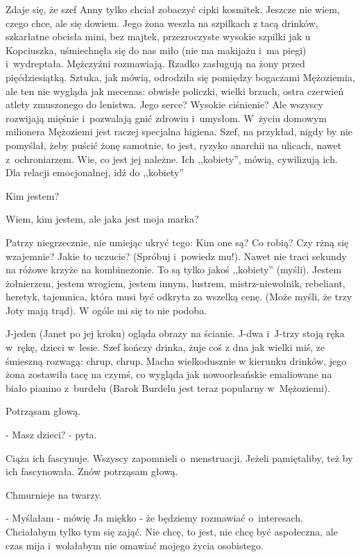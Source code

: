 \documentclass[oneside,polish,12pt,sfheadings]{mwbk}
\begin{document}
Zdaje się, że szef Anny tylko chciał zobaczyć cipki kosmitek. Jeszcze
nie wiem, czego chce, ale się dowiem. Jego żona weszła na szpilkach
z tacą drinków, szkarłatne obcisła mini, bez majtek, przezroczyste
wysokie szpilki jak u Kopciuszka, uśmiechnęła się do nas miło (nie
ma makijażu i~ma piegi) i~wydreptała. Mężczyźni rozmawiają. Rzadko
zasługują na żony przed pięćdziesiątką. Sztuka, jak mówią, odrodziła
się pomiędzy bogaczami Mężoziemia, ale ten nie wygląda jak mecenas:
obwisłe policzki, wielki brzuch, ostra czerwień atlety zmuszonego
do lenistwa. Jego serce? Wysokie ciśnienie? Ale wszyscy rozwijają
mięśnie i~pozwalają gnić zdrowiu i~umysłom. W~życiu domowym milionera
Mężoziemi jest raczej specjalna higiena. Szef, na przykład, nigdy
by nie pomyślał, żeby puścić żonę samotnie, to jest, ryzyko anarchii
na ulicach, nawet z~ochroniarzem. Wie, co jest jej należne. Ich ,,kobiety'',
mówią, cywilizują ich. Dla relacji emocjonalnej, idź do ,,kobiety''

Kim jestem?

Wiem, kim jestem, ale jaka jest moja marka?

Patrzy niegrzecznie, nie umiejąc ukryć tego: Kim one są? Co robią?
Czy rżną się wzajemnie? Jakie to uczucie? (Spróbuj i~powiedz mu!).
Nawet nie traci sekundy na różowe krzyże na kombinezonie. To są tylko
jakoś ,,kobiety'' (myśli). Jestem żołnierzem, jestem wrogiem, jestem
innym, lustrem, mistrz-niewolnik, rebeliant, heretyk, tajemnica, która
musi być odkryta za wszelką cenę. (Może myśli, że trzy Joty mają trąd).
W ogóle mi się to nie podoba.

J-jeden (Janet po jej kroku) ogląda obrazy na ścianie. J-dwa i~J-trzy
stoją ręka w~rękę, dzieci w~lesie. Szef kończy drinka, żuje coś z
dna jak wielki miś, ze śmieszną rozwagą: chrup, chrup. Macha wielkodusznie
w kierunku drinków, jego żona zostawiła tacę na czymś, co wygląda
jak nowoorleańskie emaliowane na biało pianino z~burdelu (Barok Burdelu
jest teraz popularny w~Mężoziemi).

Potrząsam głową.

- Masz dzieci? - pyta.

Ciąża ich fascynuje. Wszyscy zapomnieli o~menstruacji.
Jeżeli pamiętaliby, też by ich fascynowała. Znów potrząsam głową.

Chmurnieje na twarzy.

- Myślałam - mówię Ja miękko - że będziemy rozmawiać o~interesach.
Chciałabym tylko tym się zająć. Nie chcę, to jest, nie chcę być aspołeczna,
ale czas mija i~wolałabym nie omawiać mojego życia osobistego.
\end{document}
